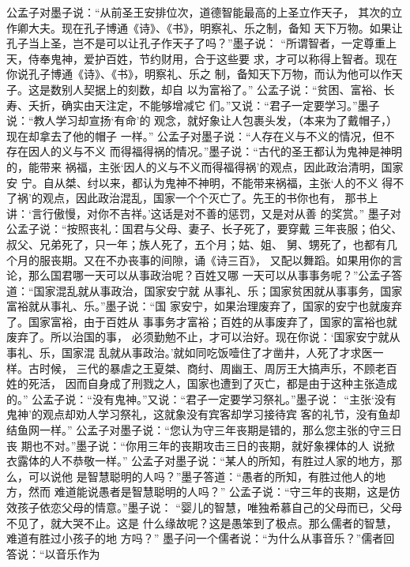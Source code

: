 \documentclass[12pt,UTF8]{ctexbook}
\begin{document}
公孟子对墨子说：“从前圣王安排位次，道德智能最高的上圣立作天子， 
其次的立作卿大夫。现在孔子博通《诗》、《书》，明察礼、乐之制，备知 
天下万物。如果让孔子当上圣，岂不是可以让孔子作天子了吗？”墨子说： 
“所谓智者，一定尊重上天，侍奉鬼神，爱护百姓，节约财用，合于这些要 
求，才可以称得上智者。现在你说孔子博通《诗》、《书》，明察礼、乐之 
制，备知天下万物，而认为他可以作天子。这是数别人契据上的刻数，却自 
以为富裕了。” 
公孟子说：“贫困、富裕、长寿、夭折，确实由天注定，不能够增减它 
们。”又说：“君子一定要学习。”墨子说：“教人学习却宣扬‘有命’的 
观念，就好象让人包裹头发，（本来为了戴帽子，）现在却拿去了他的帽子 
一样。” 
公孟子对墨子说：“人存在义与不义的情况，但不存在因人的义与不义 
而得福得祸的情况。”墨子说：“古代的圣王都认为鬼神是神明的，能带来 
祸福，主张‘因人的义与不义而得福得祸’的观点，因此政治清明，国家安 
宁。自从桀、纣以来，都认为鬼神不神明，不能带来祸福，主张‘人的不义 
得不了祸’的观点，因此政治混乱，国家一个个灭亡了。先王的书你也有， 
那书上讲：‘言行傲慢，对你不吉祥。’这话是对不善的惩罚，又是对从善 
的奖赏。” 
墨子对公孟子说：“按照丧礼：国君与父母、妻子、长子死了，要穿戴 
三年丧服；伯父、叔父、兄弟死了，只一年；族人死了，五个月；姑、姐、 
舅、甥死了，也都有几个月的服丧期。又在不办丧事的间隙，诵《诗三百》， 
又配以舞蹈。如果用你的言论，那么国君哪一天可以从事政治呢？百姓又哪 
一天可以从事事务呢？”公孟子答道：“国家混乱就从事政治，国家安宁就 
从事礼、乐；国家贫困就从事事务，国家富裕就从事礼、乐。”墨子说：“国 
家安宁，如果治理废弃了，国家的安宁也就废弃了。国家富裕，由于百姓从 
事事务才富裕；百姓的从事废弃了，国家的富裕也就废弃了。所以治国的事， 
必须勤勉不止，才可以治好。现在你说：‘国家安宁就从事礼、乐，国家混 
乱就从事政治。’就如同吃饭噎住了才凿井，人死了才求医一样。古时候， 
三代的暴虐之王夏桀、商纣、周幽王、周厉王大搞声乐，不顾老百姓的死活， 
因而自身成了刑戮之人，国家也遭到了灭亡，都是由于这种主张造成的。” 
公孟子说：“没有鬼神。”又说：“君子一定要学习祭礼。”墨子说： 
“主张‘没有鬼神’的观点却劝人学习祭礼，这就象没有宾客却学习接待宾 
客的礼节，没有鱼却结鱼网一样。” 
公孟子对墨子说：“您认为守三年丧期是错的，那么您主张的守三日丧 
期也不对。”墨子说：“你用三年的丧期攻击三日的丧期，就好象裸体的人 
说掀衣露体的人不恭敬一样。” 
公孟子对墨子说：“某人的所知，有胜过人家的地方，那么，可以说他 
是智慧聪明的人吗？”墨子答道：“愚者的所知，有胜过他人的地方，然而 
难道能说愚者是智慧聪明的人吗？” 
公孟子说：“守三年的丧期，这是仿效孩子依恋父母的情意。”墨子说： 
“婴儿的智慧，唯独希慕自己的父母而已，父母不见了，就大哭不止。这是 
什么缘故呢？这是愚笨到了极点。那么儒者的智慧，难道有胜过小孩子的地 
方吗？” 
墨子问一个儒者说：“为什么从事音乐？”儒者回答说：“以音乐作为 
\end{document}
